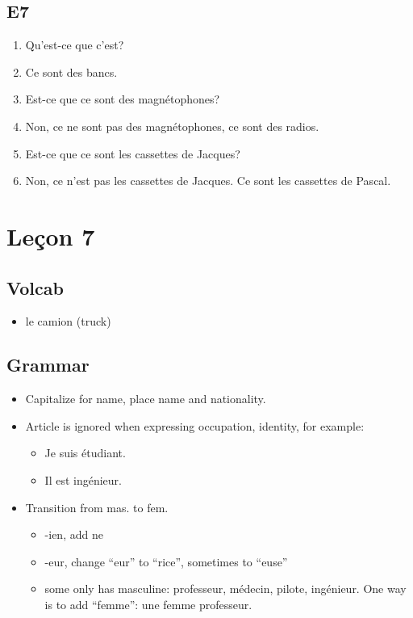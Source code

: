 \documentclass{book}
\begin{document}
    \section{E7}
        \begin{enumerate}
            \item Qu'est-ce que c'est?
            \item Ce sont des bancs.
            \item Est-ce que ce sont des magnétophones?
            \item Non, ce ne sont pas des magnétophones, ce sont des radios.
            \item Est-ce que ce sont les cassettes de Jacques?
            \item Non, ce n'est pas les cassettes de Jacques. Ce sont les cassettes de Pascal.
        \end{enumerate}

\chapter{Leçon 7}
    \section{Volcab}
        \begin{itemize}
            \item le camion (truck)
        \end{itemize}
    
    \section{Grammar}
        
        \begin{itemize}
            \item Capitalize for name, place name and nationality.
            \item Article is ignored when expressing occupation, identity, for example:
            \begin{itemize}
                \item Je suis étudiant.
                \item Il est ingénieur.
            \end{itemize}
            \item Transition from mas. to fem.
            \begin{itemize}
                \item -ien, add ne
                \item -eur, change ``eur'' to ``rice'', sometimes to ``euse''
                \item some only has masculine: professeur, médecin, pilote, ingénieur. One way is to add ``femme'': une femme professeur.
            \end{itemize}
        \end{itemize}
\end{document}
